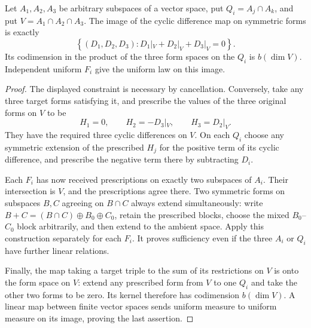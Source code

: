 \begin{lemma}\label{lem:planted-difference-image}
Let $A_1,A_2,A_3$ be arbitrary subspaces of a vector space, put
$Q_i=A_j\cap A_k$, and put $V=A_1\cap A_2\cap A_3$.
The image of the cyclic difference map on symmetric forms is exactly
\begin{equation}\label{eq:planted-difference-image}
 \left\{(D_1,D_2,D_3):
       D_1|_V+D_2|_V+D_3|_V=0\right\}.
\end{equation}
Its codimension in the product of the three form spaces on the
$Q_i$ is $b(\dim V)$.  Independent uniform $F_i$ give the uniform
law on this image.
\end{lemma}
\begin{proof}
The displayed constraint is necessary by cancellation.  Conversely,
take any three target forms satisfying it, and prescribe the values
of the three original forms on $V$ to be
\[
 H_1=0,\qquad H_2=-D_3|_V,\qquad H_3=D_2|_V.
\]
They have the required three cyclic differences on $V$.  On each
$Q_i$ choose any symmetric extension of the prescribed $H_j$ for
the positive term of its cyclic difference, and prescribe the
negative term there by subtracting $D_i$.

Each $F_i$ has now received prescriptions on exactly two subspaces
of $A_i$.  Their intersection is $V$, and the prescriptions agree
there.  Two symmetric forms on subspaces $B,C$ agreeing on
$B\cap C$ always extend simultaneously: write
$B+C=(B\cap C)\oplus B_0\oplus C_0$, retain the prescribed blocks,
choose the mixed $B_0$--$C_0$ block arbitrarily, and then extend to
the ambient space.  Apply this construction separately for each
$F_i$.  It proves sufficiency even if the three $A_i$ or $Q_i$
have further linear relations.

Finally, the map taking a target triple to the sum of its restrictions
on $V$ is onto the form space on $V$: extend any prescribed form
from $V$ to one $Q_i$ and take the other two forms to be zero.
Its kernel therefore has codimension $b(\dim V)$.  A linear map
between finite vector spaces sends uniform measure to uniform measure
on its image, proving the last assertion.
\end{proof}

